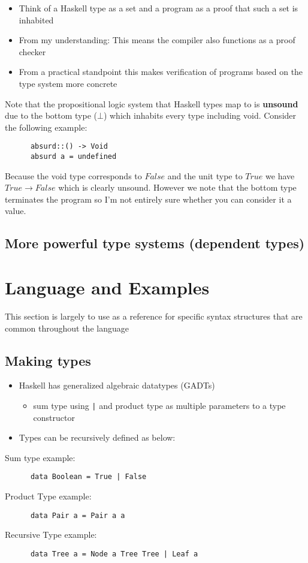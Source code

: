 \documentclass{article}
\begin{document}
\begin{itemize}
  \item Think of a Haskell type as a set and a program as a proof that such a set is inhabited
  \item From my understanding: This means the compiler also functions as a proof checker
  \item From a practical standpoint this makes verification of programs based on the type
    system more concrete
\end{itemize}
     Note that the propositional logic system that Haskell types map to is \textbf{unsound}
     due to the bottom type ($\bot$) which inhabits every type including void. Consider the
     following example:
    \begin{verbatim}
      absurd::() -> Void
      absurd a = undefined
    \end{verbatim}
      Because the void type corresponds to $False$ and the unit type to $True$
      we have $True \rightarrow False$ which is clearly unsound. However we note
      that the bottom type terminates the program so I'm not entirely sure whether
      you can consider it a value.

\subsection{More powerful type systems (dependent types)}

\section{Language and Examples}

This section is largely to use as a reference for specific syntax structures
that are common throughout the language

\subsection{Making types}
\label{sec:Making types}
\begin{itemize}
  \item  Haskell has generalized algebraic datatypes (GADTs)
    \begin{itemize}
      \item sum type using \verb.|. and product type as multiple parameters
            to a type constructor
   \end{itemize}
 \item Types can be recursively defined as below:
\end{itemize}
Sum type example:
    \begin{verbatim}
      data Boolean = True | False
    \end{verbatim}
Product Type example:
    \begin{verbatim}
      data Pair a = Pair a a
    \end{verbatim}
Recursive Type example:
    \begin{verbatim}
      data Tree a = Node a Tree Tree | Leaf a
    \end{verbatim}
\end{document}
